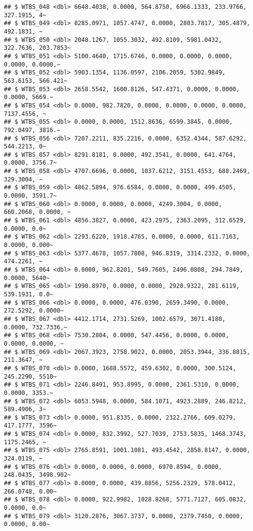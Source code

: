 \documentclass[
]{article}
\begin{document}
\begin{verbatim}
## $ WTBS_048 <dbl> 6648.4038, 0.0000, 564.8750, 6966.1333, 233.9766, 327.1915, 4~
## $ WTBS_049 <dbl> 8285.0971, 1057.4747, 0.0000, 2803.7817, 305.4879, 492.1831, ~
## $ WTBS_050 <dbl> 2048.1267, 1055.3032, 492.8109, 5981.0432, 322.7636, 203.7853~
## $ WTBS_051 <dbl> 5100.4640, 1715.6746, 0.0000, 0.0000, 0.0000, 0.0000, 0.0000,~
## $ WTBS_052 <dbl> 5903.1354, 1136.0597, 2106.2059, 5302.9849, 563.6153, 566.421~
## $ WTBS_053 <dbl> 2658.5542, 1600.8126, 547.4371, 0.0000, 0.0000, 0.0000, 5669.~
## $ WTBS_054 <dbl> 0.0000, 982.7820, 0.0000, 0.0000, 0.0000, 0.0000, 7137.4556, ~
## $ WTBS_055 <dbl> 0.0000, 0.0000, 1512.8636, 6599.3845, 0.0000, 792.0497, 3816.~
## $ WTBS_056 <dbl> 7207.2211, 835.2216, 0.0000, 6352.4344, 587.6292, 544.2213, 0~
## $ WTBS_057 <dbl> 8291.8181, 0.0000, 492.3541, 0.0000, 641.4764, 0.0000, 3756.7~
## $ WTBS_058 <dbl> 4707.6696, 0.0000, 1037.6212, 3151.4553, 688.2469, 329.3004, ~
## $ WTBS_059 <dbl> 4862.5894, 976.6584, 0.0000, 0.0000, 499.4505, 0.0000, 3591.7~
## $ WTBS_060 <dbl> 0.0000, 0.0000, 0.0000, 4249.3004, 0.0000, 660.2068, 0.0000, ~
## $ WTBS_061 <dbl> 4856.3827, 0.0000, 423.2975, 2363.2095, 312.6529, 0.0000, 0.0~
## $ WTBS_062 <dbl> 2293.6220, 1918.4765, 0.0000, 0.0000, 611.7163, 0.0000, 0.000~
## $ WTBS_063 <dbl> 5377.4678, 1057.7808, 946.8319, 3314.2332, 0.0000, 474.2261, ~
## $ WTBS_064 <dbl> 0.0000, 962.8201, 549.7605, 2496.0808, 294.7849, 0.0000, 5640~
## $ WTBS_065 <dbl> 1990.8970, 0.0000, 0.0000, 2920.9322, 281.6119, 539.1931, 0.0~
## $ WTBS_066 <dbl> 0.0000, 0.0000, 476.0390, 2659.3490, 0.0000, 272.5292, 0.0000~
## $ WTBS_067 <dbl> 4412.1714, 2731.5269, 1002.6579, 3071.4180, 0.0000, 732.7336,~
## $ WTBS_068 <dbl> 7530.2804, 0.0000, 547.4456, 0.0000, 0.0000, 0.0000, 0.0000, ~
## $ WTBS_069 <dbl> 2067.3923, 2758.9022, 0.0000, 2053.3944, 336.8815, 211.3647, ~
## $ WTBS_070 <dbl> 0.0000, 1688.5572, 459.6302, 0.0000, 300.5124, 245.2290, 5510~
## $ WTBS_071 <dbl> 2246.8491, 953.8995, 0.0000, 2361.5310, 0.0000, 0.0000, 3353.~
## $ WTBS_072 <dbl> 6053.5948, 0.0000, 584.1071, 4923.2889, 246.8212, 589.4906, 3~
## $ WTBS_073 <dbl> 0.0000, 951.8335, 0.0000, 2322.2766, 609.0279, 417.1777, 3596~
## $ WTBS_074 <dbl> 0.0000, 832.3992, 527.7039, 2753.5835, 1468.3743, 1175.2465, ~
## $ WTBS_075 <dbl> 2765.8591, 1001.1081, 493.4542, 2858.8147, 0.0000, 324.0119, ~
## $ WTBS_076 <dbl> 0.0000, 0.0000, 0.0000, 6970.8594, 0.0000, 248.0435, 3498.902~
## $ WTBS_077 <dbl> 0.0000, 0.0000, 439.8856, 5256.2329, 578.0412, 266.0748, 0.00~
## $ WTBS_078 <dbl> 0.0000, 922.9982, 1028.8268, 5771.7127, 605.0832, 0.0000, 0.0~
## $ WTBS_079 <dbl> 3120.2876, 3067.3737, 0.0000, 2379.7450, 0.0000, 0.0000, 0.00~

\end{verbatim}
\end{document}
